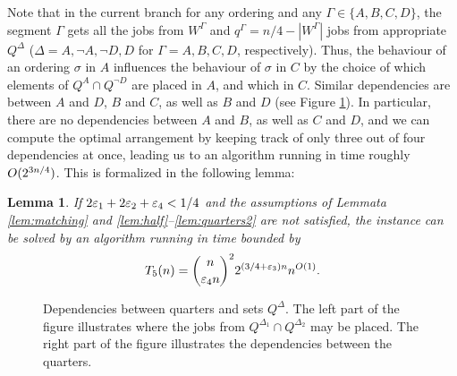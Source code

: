 \documentclass{article}
\newtheorem{lemma}[theorem]{Lemma}
\theoremstyle{definition}
\begin{document}
Note that in the current branch for any ordering and any $\Gamma \in \{A,B,C,D\}$, the segment $\Gamma$ gets all the jobs from $W^\Gamma$ and $q^\Gamma = n/4- |W^\Gamma|$
jobs from appropriate $Q^\Delta$
($\Delta=A,\neg A,\neg D,D$ for $\Gamma=A,B,C,D$, respectively).
Thus, the behaviour of an ordering $\sigma$ in $A$ influences the behaviour of $\sigma$ in $C$ by the choice of which elements of $Q^A \cap Q^{\neg D}$ are placed
in $A$, and which in $C$. Similar dependencies are between $A$ and $D$, $B$ and $C$, as well as $B$ and $D$ (see Figure \ref{fig:sched-deps}).
In particular, there are no dependencies between $A$ and $B$, as well as $C$ and $D$,
and we can compute the optimal arrangement by keeping track of only three out of four dependencies at once, leading us to an algorithm
running in time roughly $O(2^{3n/4})$.
This is formalized in the following lemma:
\begin{lemma}\label{lem:finish-him}
If $2\varepsilon_1+2\varepsilon_2+\varepsilon_4 < 1/4$ and the assumptions of Lemmata
\ref{lem:matching} and \ref{lem:half}--\ref{lem:quarters2} are not satisfied,
the instance can be solved by an algorithm running in time bounded by
$$T_5(n) = \binom{n}{\varepsilon_4 n}^2 2^{(3/4+\varepsilon_3)n} n^{O(1)}.$$
\end{lemma}

\begin{figure}[htbp]
\begin{center}
\caption{Dependencies between quarters and sets $Q^\Delta$. The left part of the figure illustrates where the jobs from $Q^{\Delta_1} \cap Q^{\Delta_2}$ may be placed.
The right part of the figure illustrates the dependencies between the quarters.}
\label{fig:sched-deps}
\end{center}
\end{figure}
\end{document}

